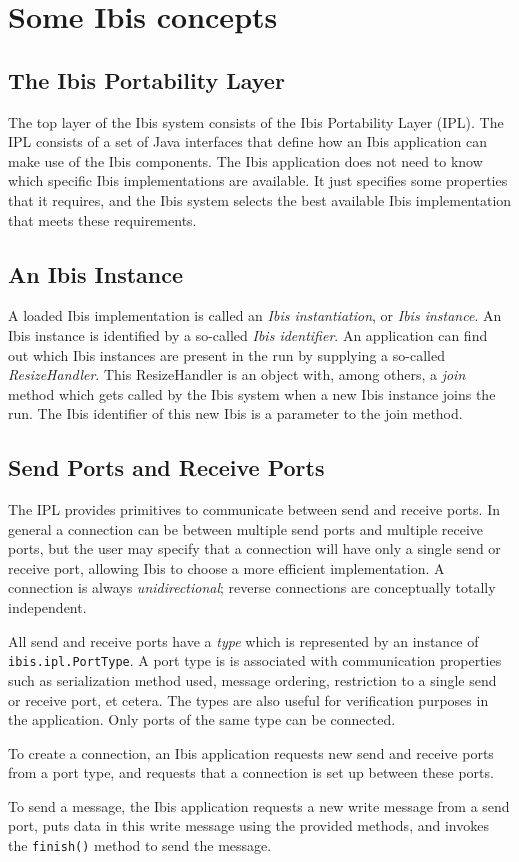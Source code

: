 \documentclass[10pt]{article}
\newcommand{\mysection}[1]{\section{#1}\label{#1}}
\newcommand{\mysubsection}[1]{\subsection{#1}\label{#1}}
\begin{document}
\mysection{Some Ibis concepts}

\mysubsection{The Ibis Portability Layer}

The top layer of the Ibis system consists of the Ibis Portability Layer (IPL).
The IPL consists of a set of Java interfaces that define how an Ibis application
can make use of the Ibis components.
The Ibis application does not need to know which specific Ibis implementations are
available.
It just specifies some properties that it requires, and the Ibis system
selects the best available Ibis implementation that meets these requirements.
 
\mysubsection{An Ibis Instance}

A loaded Ibis implementation is called an \emph{Ibis instantiation}, or 
\emph{Ibis instance}.
An Ibis instance is identified by a so-called
\emph{Ibis identifier}.
An application can find out which Ibis instances are present in the run
by supplying a so-called \emph{ResizeHandler}.
This ResizeHandler is an object with, among others, a \emph{join} method
which gets called by the Ibis system when a new Ibis instance joins the
run.
The Ibis identifier of this new Ibis is a parameter to the join method.

\mysubsection{Send Ports and Receive Ports}

The IPL provides primitives to communicate between send and receive ports.
In general a connection can be between multiple send ports and multiple
receive ports, but the user may specify that a connection will have only
a single send or receive port, allowing Ibis to choose a more efficient
implementation.  A connection is always \emph{unidirectional}; reverse
connections are conceptually totally independent.

All send and receive ports have a \emph{type} which is represented by an
instance of \texttt{ibis.ipl.PortType}. A port type is is associated
with communication properties such as serialization method used, message
ordering, restriction to a single send or receive port, et cetera. The
types are also useful for verification purposes in the application.
Only ports of the same type can be connected.

To create a connection, an Ibis application requests new send and receive
ports from a port type, and requests that a connection is set up 
between these ports.

To send a message, the Ibis application requests a new write message from
a send port, puts data in this write message using the provided methods,
and invokes the \texttt{finish()} method to send the message.
\end{document}
